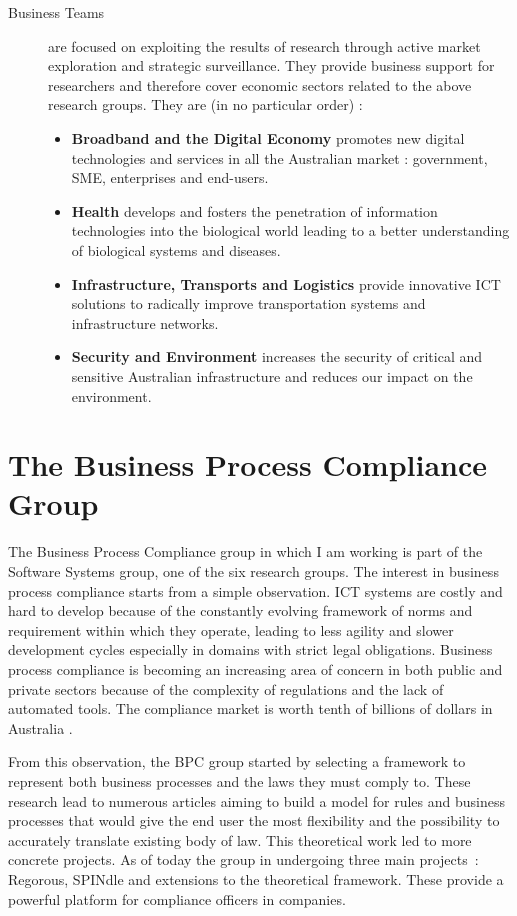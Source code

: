 \documentclass[10pt]{report}
\begin{document}
\begin{description}
\item[Business Teams] are focused on exploiting the results of research through active market exploration and strategic surveillance. They provide business support for researchers and therefore cover economic sectors related to the above research groups. They are (in no particular order) :
\begin{itemize}
\item \textbf{Broadband and the Digital Economy} promotes new digital technologies and services in all the Australian market : government, SME, enterprises and end-users.
\item \textbf{Health} develops and fosters the penetration of information technologies into the biological world leading to a better understanding of biological systems and diseases.
\item \textbf{Infrastructure, Transports and Logistics} provide innovative ICT solutions to radically improve transportation systems and infrastructure networks.
\item \textbf{Security and Environment} increases the security of critical and sensitive Australian infrastructure and reduces our impact on the environment.
\end{itemize}
\end{description}

\section{The Business Process Compliance Group}

The Business Process Compliance group in which I am working is part of the Software Systems group, one of the six research groups. The interest in business process compliance starts from a simple observation. ICT systems are costly and hard to develop because of the constantly evolving framework of norms and requirement within which they operate, leading to less agility and slower development cycles especially in domains with strict legal obligations. Business process compliance is becoming an increasing area of concern in both public and private sectors because of the complexity of regulations and the lack of automated tools. The compliance market is worth tenth of billions of dollars in Australia \autocite{BPCWebsite}.

From this observation, the BPC group started by selecting a framework to represent both business processes and the laws they must comply to. These research lead to numerous articles aiming to build a model for rules and business processes that would give the end user the most flexibility and the possibility to accurately translate existing body of law. This theoretical work led to more concrete projects. As of today the group in undergoing three main projects~: Regorous, SPINdle and extensions to the theoretical framework. These provide a powerful platform for compliance officers in companies.
\end{document}
